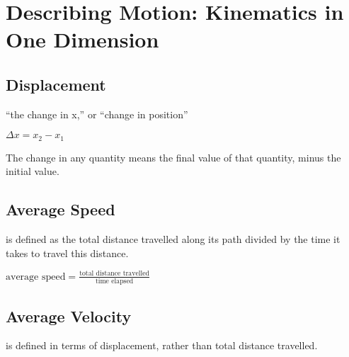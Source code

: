 \documentclass{extarticle}
\begin{document}
 


\newcommand{\markStart}[1][25]{
\begin{tcolorbox}[enhanced jigsaw,sharp corners,coltext=black,colback=BurntOrange!#1!white,boxrule=pt,breakable,size=minimal]
}


\newcommand{\markEnd}[0]{
\end{tcolorbox}
}













\iftoggle{editing}{%
}{%
  \begin{multicols}{3}
}


\setcounter{secnumdepth}{0}



\section{Describing Motion:
Kinematics in One Dimension}

\subsection{Displacement}
“the change in x,” or “change in position” 

$\Delta x = x_2 - x_1$

The change in any quantity means the final value of that quantity, minus the initial value.

\subsection{Average Speed}
is defined as the total distance travelled along its path divided by the time it takes to travel this distance.

$\text{average speed} = \frac{\text{total distance travelled}}{\text{time elapsed}}$

\subsection{Average Velocity}
is defined in terms of displacement, rather than total distance travelled.
\end{document}
